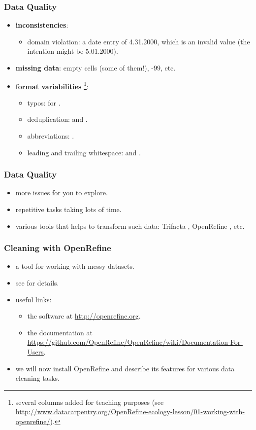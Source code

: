 \documentclass{beamer}					%
\begin{document}
 \begin{frame}[c]
  \frametitle{Data Quality}
 \begin{itemize}
 \item \textbf{inconsistencies}: 
 \begin{itemize}
 \item domain violation: a date entry of 4.31.2000, which is an invalid value (the intention might be 5.01.2000).
 \end{itemize}
 \item \textbf{missing data}: empty cells (some of them!), -99, etc. 
 \item \textbf{format variabilities} \footnote{several columns added for teaching purposes (see \footnotesize{\url{http://www.datacarpentry.org/OpenRefine-ecology-lesson/01-working-with-openrefine/}}).}: 
 \begin{itemize}
 \item typos:  for .
 \item deduplication:  and .
 \item abbreviations: . 
 \item leading and trailing whitespace:  and .
 \end{itemize}
  \end{itemize}
   \end{frame}

\begin{frame}[c]
\frametitle{Data Quality}
\begin{itemize}
 \item more issues for you to explore.
 \item repetitive tasks taking lots of time. 
 \item various tools that helps to transform such data: Trifacta \cite{Trifacta2018}, OpenRefine \cite{verborgh2013using}, etc.
\end{itemize}
\end{frame}

\begin{frame}[c]
\frametitle{Cleaning with OpenRefine}
\begin{itemize}
\item a tool for working with messy datasets.
\item see \cite{verborgh2013using} for details.
\item useful links: 
\begin{itemize}
\item the software at \footnotesize{\url{http://openrefine.org}}.
\item the documentation at \footnotesize{\url{https://github.com/OpenRefine/OpenRefine/wiki/Documentation-For-Users}}.
\end{itemize}
\item we will now install OpenRefine and describe its features for various data cleaning tasks.
\end{itemize}
\end{frame}
\end{document}
